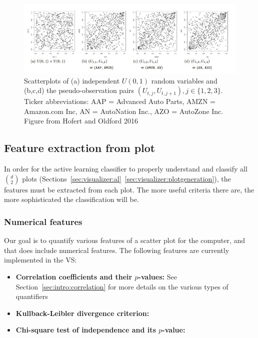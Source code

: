\begin{figure}[htb]
	\begin{center}
		\includegraphics[width=1\linewidth]{ch-visualizer/figures/hofertoldford}
		\caption[Scatterplots of independent $U(0,1)$ random variables and the
		pseudo-observation pairs $(U_{t,j},U_{t,j+1}),j\in 
		\{1,2,3\}$.]{Scatterplots of
			(a) independent $U(0,1)$ random variables and (b,c,d) the 
			pseudo-observation
			pairs $(U_{t,j},U_{t,j+1}),j\in \{1,2,3\}$. Ticker abbreviations: 
			AAP = Advanced
			Auto Parts, AMZN = Amazon.com Inc, AN = AutoNation Inc., AZO = 
			AutoZone Inc.
			Figure from Hofert and Oldford 2016~\cite{hofert2016}}
		\label{fig:visualizer:hofertoldford}
	\end{center}
\end{figure}

\subsection{Feature extraction from plot}
\label{sec:visualizer:scatterplot:features}

In order for the active learning classifier to properly understand and classify 
all $d \choose 2$ plots 
(Sections~\ref{sec:visualizer:al}~\ref{sec:visualizer:plotgeneration}), the 
features must be extracted from each plot. The more useful criteria there are, 
the more sophisticated the classification will be.

\subsubsection{Numerical features}

Our goal is to quantify various features of a scatter plot for the computer, 
and that does include numerical features. The following features are currently 
implemented in the VS: 

\tablespacing
\begin{itemize}
	\item \textbf{Correlation coefficients and their $p$-values:} See 
	Section~\ref{sec:intro:correlation} for more details on the various types 
	of quantifiers
	\item \textbf{Kullback-Leibler divergence criterion:}
	\item \textbf{Chi-square test of independence and its $p$-value:}
\end{itemize}
\bodyspacing 

